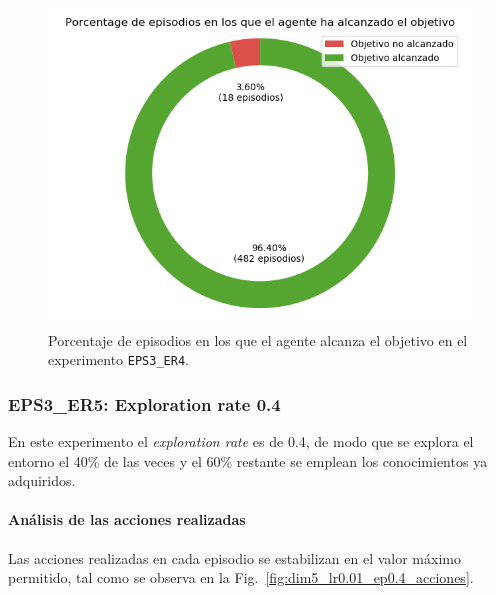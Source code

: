 \begin{figure}
    \centering
    \includegraphics[scale=0.4]{cap5_experimentacion/images/dim5_lr0.01_ep0.3_porcentajeResuelto.png}
    \caption{Porcentaje de episodios en los que el agente alcanza el objetivo en el experimento \texttt{EPS3\_ER4}.}
    \label{fig:dim5_lr0.01_ep0.3_porcentajeResuelto}
\end{figure}

\subsubsection{EPS3\_ER5: Exploration rate 0.4} \label{EPS3_ER5}

En este experimento el \textit{exploration rate} es de 0.4, de modo que se explora el entorno el 40\% de las veces y el 60\% restante se emplean los conocimientos ya adquiridos. \\

\paragraph{Análisis de las acciones realizadas}

Las acciones realizadas en cada episodio se estabilizan en el valor máximo permitido, tal como se observa en la Fig.~\ref{fig:dim5_lr0.01_ep0.4_acciones}. \\

